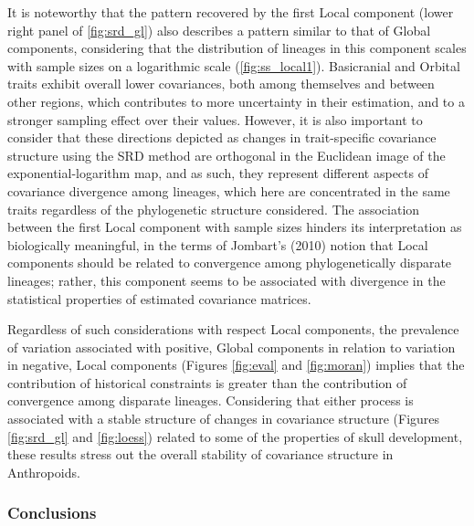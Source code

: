 \documentclass[12pt,twoside]{report}
\begin{document}
It is noteworthy that the pattern recovered by the first Local component
(lower right panel of \autoref{fig:srd_gl}) also describes a pattern
similar to that of Global components, considering that the distribution
of lineages in this component scales with sample sizes on a logarithmic
scale (\autoref{fig:ss_local1}). Basicranial and Orbital traits exhibit
overall lower covariances, both among themselves and between other
regions, which contributes to more uncertainty in their estimation, and
to a stronger sampling effect over their values. However, it is also
important to consider that these directions depicted as changes in
trait-specific covariance structure using the SRD method are orthogonal
in the Euclidean image of the exponential-logarithm map, and as such,
they represent different aspects of covariance divergence among
lineages, which here are concentrated in the same traits regardless of
the phylogenetic structure considered. The association between the first
Local component with sample sizes hinders its interpretation as
biologically meaningful, in the terms of Jombart's (2010) notion that
Local components should be related to convergence among phylogenetically
disparate lineages; rather, this component seems to be associated with
divergence in the statistical properties of estimated covariance
matrices.

Regardless of such considerations with respect Local components, the
prevalence of variation associated with positive, Global components in
relation to variation in negative, Local components (Figures
\ref{fig:eval} and \ref{fig:moran}) implies that the contribution of
historical constraints is greater than the contribution of convergence
among disparate lineages. Considering that either process is associated
with a stable structure of changes in covariance structure (Figures
\ref{fig:srd_gl} and \ref{fig:loess}) related to some of the properties
of skull development, these results stress out the overall stability of
covariance structure in Anthropoids.

\subsubsection{Conclusions}\label{conclusions}
\end{document}
